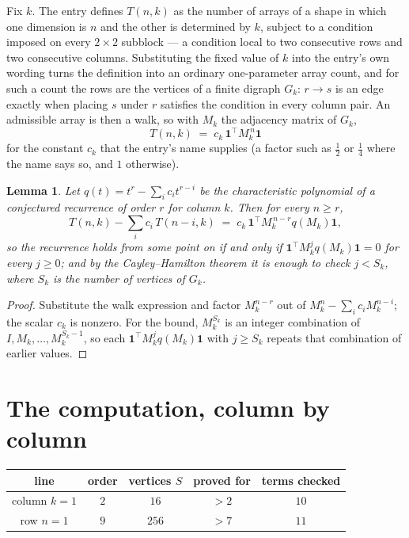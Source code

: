 \documentclass[11pt,a4paper]{article}
\theoremstyle{plain}
\newtheorem{lemma}[theorem]{Lemma}
\theoremstyle{definition}
\begin{document}
Fix $k$. The entry defines $T(n,k)$ as the number of arrays of a shape in which one dimension
is $n$ and the other is determined by $k$, subject to a condition imposed on every
$2\times2$ subblock --- a condition local to two consecutive rows and two consecutive columns.
Substituting the fixed value of $k$ into the entry's own wording turns the definition into an
ordinary one-parameter array count, and for such a count the rows are the vertices of a finite
digraph $G_k$: $r\to s$ is an edge exactly when placing $s$ under $r$ satisfies the condition
in every column pair. An admissible array is then a walk, so with $M_k$ the adjacency matrix
of $G_k$,
\[
T(n,k)\;=\;c_k\,\mathbf{1}^{\!\top}M_k^{\,n}\mathbf{1}
\]
for the constant $c_k$ that the entry's name supplies (a factor such as $\tfrac12$ or
$\tfrac14$ where the name says so, and $1$ otherwise).

\begin{lemma}\label{lem:crit}
Let $q(t)=t^{r}-\sum_i c_it^{r-i}$ be the characteristic polynomial of a conjectured
recurrence of order $r$ for column $k$. Then for every $n\ge r$,
\[
T(n,k)-\sum_i c_i\,T(n-i,k)\;=\;c_k\,\mathbf{1}^{\!\top}M_k^{\,n-r}q(M_k)\mathbf{1},
\]
so the recurrence holds from some point on if and only if
$\mathbf{1}^{\!\top}M_k^{j}q(M_k)\mathbf{1}=0$ for every $j\ge0$; and by the
Cayley--Hamilton theorem it is enough to check $j<S_k$, where $S_k$ is the number of vertices
of $G_k$.
\end{lemma}

\begin{proof}
Substitute the walk expression and factor $M_k^{n-r}$ out of $M_k^{n}-\sum_ic_iM_k^{n-i}$;
the scalar $c_k$ is nonzero. For the bound, $M_k^{S_k}$ is an integer combination of
$I,M_k,\dots,M_k^{S_k-1}$, so each $\mathbf{1}^{\!\top}M_k^{j}q(M_k)\mathbf{1}$ with
$j\ge S_k$ repeats that combination of earlier values.
\end{proof}

\section{The computation, column by column}

\begin{center}
\begin{tabular}{ccccc}
line & order & vertices $S$ & proved for & terms checked \\ \hline
column $k$$=1$ & $2$ & $16$ & $>2$ & $10$ \\
row $n$$=1$ & $9$ & $256$ & $>7$ & $11$ \\
\end{tabular}
\end{center}
\end{document}
